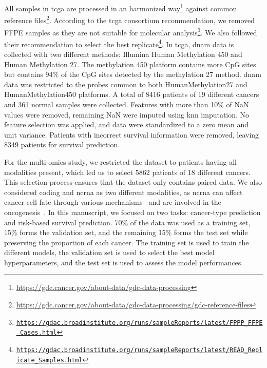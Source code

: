 \documentclass[../main.tex]{subfiles}
\begin{document}
		All samples in \gls{tcga} are processed in an harmonized way\footnote{\url{https://gdc.cancer.gov/about-data/gdc-data-processing}} against common reference files\footnote{\url{https://gdc.cancer.gov/about-data/gdc-data-processing/gdc-reference-files}}.
		According to the \gls{tcga} consortium recommendation, we removed FFPE samples as they are not suitable for molecular analysis\footnote{\href{https://web.archive.org/web/20150919082952/https://gdac.broadinstitute.org/runs/sampleReports/latest/FPPP_FFPE_Cases.html}{\nolinkurl{https://gdac.broadinstitute.org/runs/sampleReports/latest/FPPP\_FFPE\_Cases.html}}}.
		We also followed their recommendation to select the best replicate\footnote{\href{https://web.archive.org/web/20150919044554/http://gdac.broadinstitute.org/runs/sampleReports/latest/READ_Replicate_Samples.html}{\nolinkurl{https://gdac.broadinstitute.org/runs/sampleReports/latest/READ\_Replicate\_Samples.html}}}.
		In \gls{tcga}, \gls{dnam} data is collected with two different methods: Illumina Human Methylation 450 and Human Methylation 27.
		The methylation 450 platform contains more CpG sites but contains 94\% of the CpG sites detected by the methylation 27 method.
		\Gls{dnam} data was restricted to the probes common to both HumanMethylation27 and HumanMethylation450 platforms.
		A total of 8416 patients of 19 different cancers and 361 normal samples were collected.
		Features with more than 10\% of NaN values were removed, remaining NaN were imputed using \gls{knn} imputation.
		No feature selection was applied, and data were standardized to a zero mean and unit variance.
		Patients with incorrect survival information were removed, leaving 8349 patients for survival prediction.

		For the multi-omics study, we restricted the dataset to patients having all modalities present, which led us to select 5862 patients of 18 different cancers.
		This selection process ensures that the dataset only contains paired data.
		We also considered coding and \gls{ncrna} as two different modalities, as \gls{ncrna} can affect cancer cell fate through various mechanisms~\cite{Grillone2020} and are involved in the oncogenesis~\cite{Toden2021}.
		In this manuscript, we focused on two tasks: cancer-type prediction and risk-based survival prediction.
		70\% of the data was used as a training set, 15\% forms the validation set, and the remaining 15\% forms the test set while preserving the proportion of each cancer.
		The training set is used to train the different models, the validation set is used to select the best model hyperparameters, and the test set is used to assess the model performances.
\end{document}
